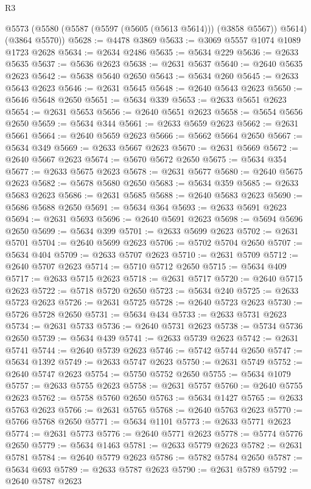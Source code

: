 \begin{lexlean}{R3}
\begin{coremodule}
    @5573 (@5580 (@5587 (@5597 (@5605 (@5613 @5614))) (@3858 @5567)) @5614) (@3864 @5570))
@5628 := @4478 @3869
@5633 := @3069 @5557 @1074 @1089 @1723 @2628
@5634 := @2634 @2486
@5635 := @5634 @229
@5636 := @2633 @5635
@5637 := @5636 @2623
@5638 := @2631 @5637
@5640 := @2640 @5635 @2623
@5642 := @5638 @5640 @2650
@5643 := @5634 @260
@5645 := @2633 @5643 @2623
@5646 := @2631 @5645
@5648 := @2640 @5643 @2623
@5650 := @5646 @5648 @2650
@5651 := @5634 @339
@5653 := @2633 @5651 @2623
@5654 := @2631 @5653
@5656 := @2640 @5651 @2623
@5658 := @5654 @5656 @2650
@5659 := @5634 @344
@5661 := @2633 @5659 @2623
@5662 := @2631 @5661
@5664 := @2640 @5659 @2623
@5666 := @5662 @5664 @2650
@5667 := @5634 @349
@5669 := @2633 @5667 @2623
@5670 := @2631 @5669
@5672 := @2640 @5667 @2623
@5674 := @5670 @5672 @2650
@5675 := @5634 @354
@5677 := @2633 @5675 @2623
@5678 := @2631 @5677
@5680 := @2640 @5675 @2623
@5682 := @5678 @5680 @2650
@5683 := @5634 @359
@5685 := @2633 @5683 @2623
@5686 := @2631 @5685
@5688 := @2640 @5683 @2623
@5690 := @5686 @5688 @2650
@5691 := @5634 @364
@5693 := @2633 @5691 @2623
@5694 := @2631 @5693
@5696 := @2640 @5691 @2623
@5698 := @5694 @5696 @2650
@5699 := @5634 @399
@5701 := @2633 @5699 @2623
@5702 := @2631 @5701
@5704 := @2640 @5699 @2623
@5706 := @5702 @5704 @2650
@5707 := @5634 @404
@5709 := @2633 @5707 @2623
@5710 := @2631 @5709
@5712 := @2640 @5707 @2623
@5714 := @5710 @5712 @2650
@5715 := @5634 @409
@5717 := @2633 @5715 @2623
@5718 := @2631 @5717
@5720 := @2640 @5715 @2623
@5722 := @5718 @5720 @2650
@5723 := @5634 @240
@5725 := @2633 @5723 @2623
@5726 := @2631 @5725
@5728 := @2640 @5723 @2623
@5730 := @5726 @5728 @2650
@5731 := @5634 @434
@5733 := @2633 @5731 @2623
@5734 := @2631 @5733
@5736 := @2640 @5731 @2623
@5738 := @5734 @5736 @2650
@5739 := @5634 @439
@5741 := @2633 @5739 @2623
@5742 := @2631 @5741
@5744 := @2640 @5739 @2623
@5746 := @5742 @5744 @2650
@5747 := @5634 @1392
@5749 := @2633 @5747 @2623
@5750 := @2631 @5749
@5752 := @2640 @5747 @2623
@5754 := @5750 @5752 @2650
@5755 := @5634 @1079
@5757 := @2633 @5755 @2623
@5758 := @2631 @5757
@5760 := @2640 @5755 @2623
@5762 := @5758 @5760 @2650
@5763 := @5634 @1427
@5765 := @2633 @5763 @2623
@5766 := @2631 @5765
@5768 := @2640 @5763 @2623
@5770 := @5766 @5768 @2650
@5771 := @5634 @1101
@5773 := @2633 @5771 @2623
@5774 := @2631 @5773
@5776 := @2640 @5771 @2623
@5778 := @5774 @5776 @2650
@5779 := @5634 @1463
@5781 := @2633 @5779 @2623
@5782 := @2631 @5781
@5784 := @2640 @5779 @2623
@5786 := @5782 @5784 @2650
@5787 := @5634 @693
@5789 := @2633 @5787 @2623
@5790 := @2631 @5789
@5792 := @2640 @5787 @2623

\end{coremodule}
\end{lexlean}
